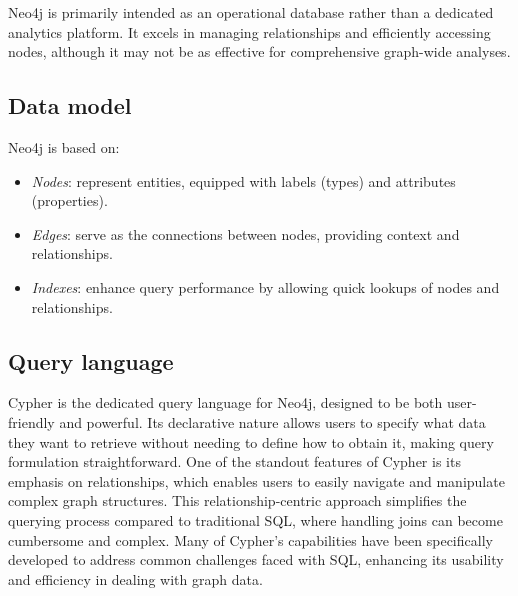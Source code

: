Neo4j is primarily intended as an operational database rather than a dedicated analytics platform.
It excels in managing relationships and efficiently accessing nodes, although it may not be as effective for comprehensive graph-wide analyses.

\subsection{Data model}
Neo4j is based on: 
\begin{itemize}
    \item \textit{Nodes}: represent entities, equipped with labels (types) and attributes (properties).
    \item \textit{Edges}: serve as the connections between nodes, providing context and relationships.
    \item \textit{Indexes}: enhance query performance by allowing quick lookups of nodes and relationships.
\end{itemize}

\subsection{Query language}
Cypher is the dedicated query language for Neo4j, designed to be both user-friendly and powerful. 
Its declarative nature allows users to specify what data they want to retrieve without needing to define how to obtain it, making query formulation straightforward.
One of the standout features of Cypher is its emphasis on relationships, which enables users to easily navigate and manipulate complex graph structures. 
This relationship-centric approach simplifies the querying process compared to traditional SQL, where handling joins can become cumbersome and complex.
Many of Cypher's capabilities have been specifically developed to address common challenges faced with SQL, enhancing its usability and efficiency in dealing with graph data. 

